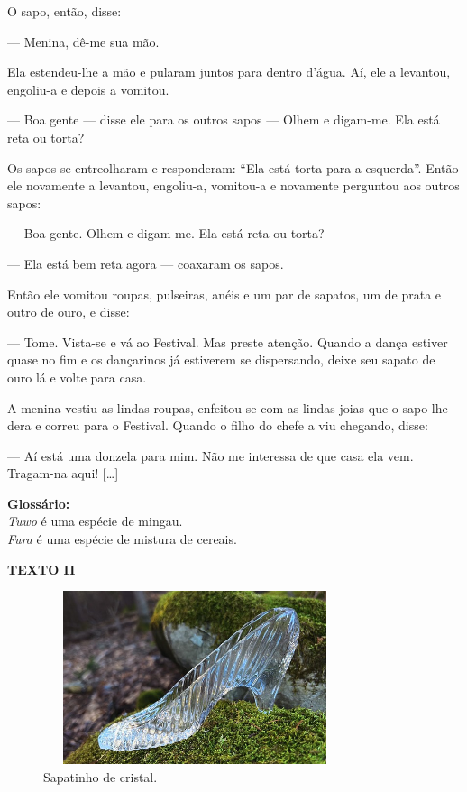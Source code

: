 \begin{myquote}
O sapo, então, disse:

— Menina, dê-me sua mão. 

Ela estendeu-lhe a mão e pularam juntos para dentro d'água. Aí, ele a levantou, engoliu-a e depois a vomitou.

— Boa gente — disse ele para os outros sapos — Olhem e digam-me. Ela
está reta ou torta? 

Os sapos se entreolharam e responderam: ``Ela está
torta para a esquerda''. Então ele novamente a levantou, engoliu-a,
vomitou-a e novamente perguntou aos outros sapos:

— Boa gente. Olhem e digam-me. Ela está reta ou torta?

— Ela está bem reta agora — coaxaram os sapos.

Então ele vomitou roupas, pulseiras, anéis e um par de sapatos, um de
prata e outro de ouro, e disse:

— Tome. Vista-se e vá ao Festival. Mas preste atenção. Quando a dança
estiver quase no fim e os dançarinos já estiverem se dispersando, deixe
seu sapato de ouro lá e volte para casa.

A menina vestiu as lindas roupas, enfeitou-se com as lindas joias que o
sapo lhe dera e correu para o Festival. Quando o filho do chefe a viu
chegando, disse:

— Aí está uma donzela para mim. Não me interessa de que casa ela vem.
Tragam-na aqui! {[}\ldots{}{]}


\noindent\textbf{Glossário:}\\
\emph{Tuwo} é uma espécie de mingau.\\
\emph{Fura} é uma espécie de mistura de cereais.
\end{myquote}

\begin{myquote}
\begin{center}
\textbf{TEXTO II}
\end{center}

\begin{figure}[H]
\centering\includegraphics[width=3.5in,height=2in]{./imgSAEB_6_POR/media/image9b.jpeg}
\caption{Sapatinho de cristal.}
\end{figure}
\end{myquote}

